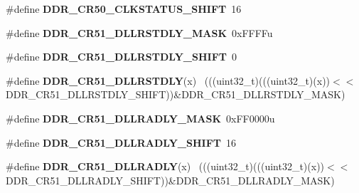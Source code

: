 \begin{DoxyCompactItemize}
\item 
\hypertarget{group___d_d_r___register___masks_ga00210fe46e936c0fcdc2a0cffd3d9c68}{}\#define {\bfseries D\+D\+R\+\_\+\+C\+R50\+\_\+\+C\+L\+K\+S\+T\+A\+T\+U\+S\+\_\+\+S\+H\+I\+F\+T}~16\label{group___d_d_r___register___masks_ga00210fe46e936c0fcdc2a0cffd3d9c68}

\item 
\hypertarget{group___d_d_r___register___masks_ga55d6abdb1c8b96c5c90055b1ffc1ca06}{}\#define {\bfseries D\+D\+R\+\_\+\+C\+R51\+\_\+\+D\+L\+L\+R\+S\+T\+D\+L\+Y\+\_\+\+M\+A\+S\+K}~0x\+F\+F\+F\+Fu\label{group___d_d_r___register___masks_ga55d6abdb1c8b96c5c90055b1ffc1ca06}

\item 
\hypertarget{group___d_d_r___register___masks_ga5787fea670b51b33ac083a161435f3d7}{}\#define {\bfseries D\+D\+R\+\_\+\+C\+R51\+\_\+\+D\+L\+L\+R\+S\+T\+D\+L\+Y\+\_\+\+S\+H\+I\+F\+T}~0\label{group___d_d_r___register___masks_ga5787fea670b51b33ac083a161435f3d7}

\item 
\hypertarget{group___d_d_r___register___masks_ga2e67b9318a944ffeeb2528b0e276ef75}{}\#define {\bfseries D\+D\+R\+\_\+\+C\+R51\+\_\+\+D\+L\+L\+R\+S\+T\+D\+L\+Y}(x)                                    ~(((uint32\+\_\+t)(((uint32\+\_\+t)(x))$<$$<$D\+D\+R\+\_\+\+C\+R51\+\_\+\+D\+L\+L\+R\+S\+T\+D\+L\+Y\+\_\+\+S\+H\+I\+F\+T))\&D\+D\+R\+\_\+\+C\+R51\+\_\+\+D\+L\+L\+R\+S\+T\+D\+L\+Y\+\_\+\+M\+A\+S\+K)\label{group___d_d_r___register___masks_ga2e67b9318a944ffeeb2528b0e276ef75}

\item 
\hypertarget{group___d_d_r___register___masks_gafe4ae0585b0dfe499f31753e6b94c6fc}{}\#define {\bfseries D\+D\+R\+\_\+\+C\+R51\+\_\+\+D\+L\+L\+R\+A\+D\+L\+Y\+\_\+\+M\+A\+S\+K}~0x\+F\+F0000u\label{group___d_d_r___register___masks_gafe4ae0585b0dfe499f31753e6b94c6fc}

\item 
\hypertarget{group___d_d_r___register___masks_gaf38f44fd706940292f3aac372f52dbef}{}\#define {\bfseries D\+D\+R\+\_\+\+C\+R51\+\_\+\+D\+L\+L\+R\+A\+D\+L\+Y\+\_\+\+S\+H\+I\+F\+T}~16\label{group___d_d_r___register___masks_gaf38f44fd706940292f3aac372f52dbef}

\item 
\hypertarget{group___d_d_r___register___masks_ga407b7ff5157c162bf3c787290edfefae}{}\#define {\bfseries D\+D\+R\+\_\+\+C\+R51\+\_\+\+D\+L\+L\+R\+A\+D\+L\+Y}(x)                                      ~(((uint32\+\_\+t)(((uint32\+\_\+t)(x))$<$$<$D\+D\+R\+\_\+\+C\+R51\+\_\+\+D\+L\+L\+R\+A\+D\+L\+Y\+\_\+\+S\+H\+I\+F\+T))\&D\+D\+R\+\_\+\+C\+R51\+\_\+\+D\+L\+L\+R\+A\+D\+L\+Y\+\_\+\+M\+A\+S\+K)\label{group___d_d_r___register___masks_ga407b7ff5157c162bf3c787290edfefae}


\end{DoxyCompactItemize}
